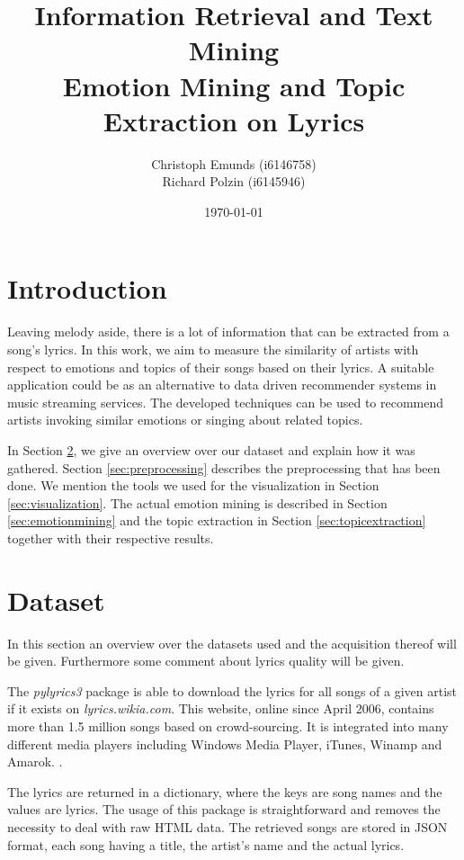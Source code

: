 \documentclass[10pt,a4paper]{article}
\author{Christoph Emunds (i6146758)\\Richard Polzin (i6145946)}
\title{Information Retrieval and Text Mining\\Emotion Mining and Topic Extraction on Lyrics}
\date{\today}
\begin{document}
	\maketitle
	
	\tableofcontents
	
	\section{Introduction}
	\label{sec:introduction}
	Leaving melody aside, there is a lot of information that can be extracted from a song's lyrics. In this work, we aim to measure the similarity of artists with respect to emotions and topics of their songs based on their lyrics. A suitable application could be as an alternative to data driven recommender systems in music streaming services. The developed techniques can be used to recommend artists invoking similar emotions or singing about related topics.
	
	In Section \ref{sec:dataset}, we give an overview over our dataset and explain how it was gathered. Section \ref{sec:preprocessing} describes the preprocessing that has been done. We mention the tools we used for the visualization in Section \ref{sec:visualization}. The actual emotion mining is described in Section \ref{sec:emotionmining} and the topic extraction in Section \ref{sec:topicextraction} together with their respective results.

	\section{Dataset}
	\label{sec:dataset}
	In this section an overview over the datasets used and the acquisition thereof will be given. Furthermore some comment about lyrics quality will be given.

	The \textit{pylyrics3} package \cite{pylyrics3} is able to download the lyrics for all songs of a given artist if it exists on \textit{lyrics.wikia.com}. This website, online since April 2006, contains more than 1.5 million songs based on crowd-sourcing. It is integrated into many different media players including Windows Media Player, iTunes, Winamp and Amarok. \cite{lyricwikia}.
	
	The lyrics are returned in a dictionary, where the keys are song names and the values are lyrics. The usage of this package is straightforward and removes the necessity to deal with raw HTML data. The retrieved songs are stored in JSON format, each song having a title, the artist's name and the actual lyrics.
	
\end{document}
